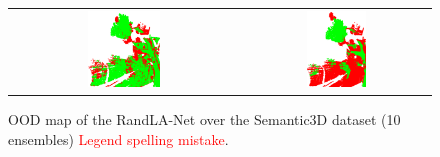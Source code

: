 \begin{figure}[h!]
\begin{tabular}{cc}
            \includegraphics[width=0.33\textwidth, height=0.18\textheight]{images/ood_imgs/sem3d_of/ent/de_sem3d_OOD_3.pdf}&
            \includegraphics[width=0.33\textwidth, height=0.18\textheight]{images/ood_imgs/sem3d_of/ent/de_sem3d_of_OOD_3.pdf}\\
        \end{tabular}
        \caption{OOD map of the RandLA-Net over the Semantic3D dataset (10 ensembles) \textcolor{red}{Legend spelling mistake}.}
        \label{fig:de_oodmap_sem3d_OF_ent}
    \end{figure}

